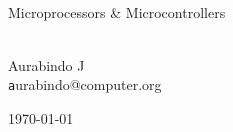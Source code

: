 \begin{titlepage}

\vspace*{6cm}
\thispagestyle{empty}
\begin{center}
\HRule \\[0.4cm] { \Huge \textsc Microprocessors \& Microcontrollers}\\[0.4cm] \HRule \\[1.5cm]


\begin{center} {\large Aurabindo J} \\[.2cm] {\texttt aurabindo@computer.org}
\end{center} 



\vfill
{\large \today}

\end{center}


\end{titlepage}
